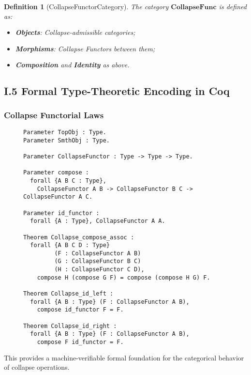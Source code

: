 \documentclass[11pt]{article}
\newtheorem{definition}[theorem]{Definition}
\begin{document}
\begin{definition}[CollapseFunctorCategory]
The category \( \mathbf{CollapseFunc} \) is defined as:

\begin{itemize}
    \item \textbf{Objects}: Collapse-admissible categories;
    \item \textbf{Morphisms}: Collapse Functors between them;
    \item \textbf{Composition} and \textbf{Identity} as above.
\end{itemize}
\end{definition}

\subsection*{I.5 Formal Type-Theoretic Encoding in Coq}

\subsubsection*{Collapse Functorial Laws}

\begin{figure}[h]
\centering
\begin{lstlisting}[language=Coq, mathescape=false]
Parameter TopObj : Type.
Parameter SmthObj : Type.

Parameter CollapseFunctor : Type -> Type -> Type.

Parameter compose :
  forall {A B C : Type},
    CollapseFunctor A B -> CollapseFunctor B C -> CollapseFunctor A C.

Parameter id_functor :
  forall {A : Type}, CollapseFunctor A A.

Theorem Collapse_compose_assoc :
  forall {A B C D : Type}
         (F : CollapseFunctor A B)
         (G : CollapseFunctor B C)
         (H : CollapseFunctor C D),
    compose H (compose G F) = compose (compose H G) F.

Theorem Collapse_id_left :
  forall {A B : Type} (F : CollapseFunctor A B),
    compose id_functor F = F.

Theorem Collapse_id_right :
  forall {A B : Type} (F : CollapseFunctor A B),
    compose F id_functor = F.
\end{lstlisting}
\end{figure}

This provides a machine-verifiable formal foundation for the categorical behavior of collapse operations.
\end{document}
